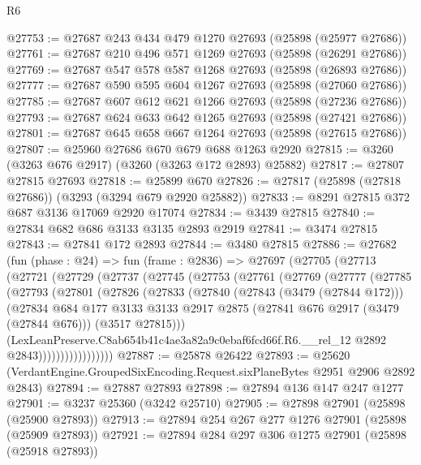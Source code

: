 \begin{lexlean}{R6}
\begin{coremodule}
@27753 := @27687 @243 @434 @479 @1270 @27693 (@25898 (@25977 @27686))
@27761 := @27687 @210 @496 @571 @1269 @27693 (@25898 (@26291 @27686))
@27769 := @27687 @547 @578 @587 @1268 @27693 (@25898 (@26893 @27686))
@27777 := @27687 @590 @595 @604 @1267 @27693 (@25898 (@27060 @27686))
@27785 := @27687 @607 @612 @621 @1266 @27693 (@25898 (@27236 @27686))
@27793 := @27687 @624 @633 @642 @1265 @27693 (@25898 (@27421 @27686))
@27801 := @27687 @645 @658 @667 @1264 @27693 (@25898 (@27615 @27686))
@27807 := @25960 @27686 @670 @679 @688 @1263 @2920
@27815 := @3260 (@3263 @676 @2917) (@3260 (@3263 @172 @2893) @25882)
@27817 := @27807 @27815 @27693
@27818 := @25899 @670
@27826 := @27817 (@25898 (@27818 @27686)) (@3293 (@3294 @679 @2920 @25882))
@27833 := @8291 @27815 @372 @687 @3136 @17069 @2920 @17074
@27834 := @3439 @27815
@27840 := @27834 @682 @686 @3133 @3135 @2893 @2919
@27841 := @3474 @27815
@27843 := @27841 @172 @2893
@27844 := @3480 @27815
@27886 := @27682
    (fun (phase : @24) =>
    fun (frame : @2836) =>
    @27697
      (@27705
        (@27713
          (@27721
            (@27729
              (@27737
                (@27745
                  (@27753
                    (@27761
                      (@27769
                        (@27777
                          (@27785
                            (@27793
                              (@27801
                                (@27826
                                  (@27833
                                    (@27840
                                      (@27843 (@3479 (@27844 @172)))
                                      (@27834
                                        @684
                                        @177
                                        @3133
                                        @3133
                                        @2917
                                        @2875
                                        (@27841 @676 @2917 (@3479 (@27844 @676)))
                                        (@3517 @27815)))
                                    (LexLeanPreserve.C8ab654b41c4ae3a82a9c0ebaf6fcd66f.R6.__rel_12
                                      @2892
                                      @2843)))))))))))))))))
@27887 := @25878 @26422
@27893 := @25620 (VerdantEngine.GroupedSixEncoding.Request.sixPlaneBytes @2951 @2906 @2892 @2843)
@27894 := @27887 @27893
@27898 := @27894 @136 @147 @247 @1277
@27901 := @3237 @25360 (@3242 @25710)
@27905 := @27898 @27901 (@25898 (@25900 @27893))
@27913 := @27894 @254 @267 @277 @1276 @27901 (@25898 (@25909 @27893))
@27921 := @27894 @284 @297 @306 @1275 @27901 (@25898 (@25918 @27893))

\end{coremodule}
\end{lexlean}

